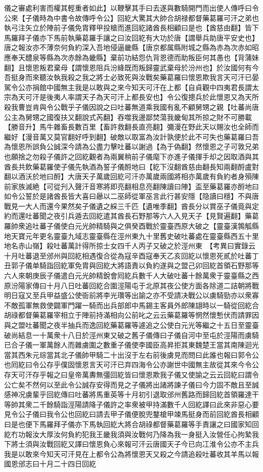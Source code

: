 儀之審處利害而權其輕重者如此】以鞭擊其手曰去遂與數騎開門而出使人傳呼曰令公來【子儀時為中書令故傳呼令公】回紇大驚其大帥合胡禄都督藥葛羅可汗之弟也執弓注矢立於陣前子儀免胄釋甲投槍而進回紇諸酋長相顧曰是也【酋慈由翻】皆下馬羅拜子儀亦下馬前執藥葛羅手讓之曰汝回紇有大功於唐【謂舉兵助唐平安史也】唐之報汝亦不薄奈何負約深入吾地侵逼畿縣【唐京都属縣附城之縣為赤為次赤如昭應奉天醴泉等縣為次赤餘為畿縣】棄前功結怨仇背恩德而助叛臣何其愚也【背蒲妹翻】且懷恩叛君棄母【謂懷恩阻兵汾絳既而叛歸靈武棄母於汾州也】於汝國何有今吾挺身而來聽汝執我殺之我之將士必致死與汝戰矣藥葛羅曰懷恩欺我言天可汗已晏駕令公亦捐館中國無主我是以敢與之來今知天可汗在上都【自貞觀中四夷君長謂太宗為天可汗是後夷人率謂天子為天可汗上都長安也】令公復摠兵於此懷恩又為天所殺我曹豈肯與令公戰乎子儀因說之曰吐蕃無道乘我國有亂不顧舅甥之親【吐蕃尚唐公主為舅甥之國復扶又翻說式芮翻】吞噬我邊鄙焚蕩我畿甸其所掠之財不可勝載【勝音升】馬牛雜畜長數百里【畜許救翻長直亮翻】彌漫在野此天以賜汝也全師而繼好【漫音萬又莫官翻好呼到翻】破敵以取富為汝計孰便於此不可失也藥葛羅曰吾為懷恩所誤負公誠深今請為公盡力擊吐蕃以謝過【為于偽翻】然懷恩之子可敦兄弟也願捨之勿殺子儀許之回紇觀者為兩翼稍前子儀麾下亦進子儀揮手却之因取酒與其酋長共飲藥葛羅使子儀先執酒為誓子儀酹地曰【紇下沒翻酋慈由翻長知兩翻酹盧對翻以酒沃於地曰酹】大唐天子萬歲回紇可汗亦萬歲兩國將相亦萬歲有負約者身殞陳前家族滅絶【可從刋入聲汗音寒將即亮翻相息亮翻陳讀曰陣】盃至藥葛羅亦酹地曰如令公誓於是諸酋長皆大喜曰曏以二巫師從軍巫言此行甚安隱【隐讀曰穩】不與唐戰見一大人而還今果然矣子儀遺之綵三千匹【遺唯季翻】酋長分以賞巫子儀竟與定約而還吐蕃聞之夜引兵遁去回紇遣其酋長石野那等六人入見天子【見賢遍翻】藥葛羅帥衆追吐蕃子儀使白元光帥精騎與之俱癸酉戰於靈臺西原大破之【靈臺漢鶉觚縣地天寶元年更名靈臺九域志靈臺縣在涇州東九十里舊史破吐蕃處在靈臺縣西五十里地名赤山嶺】殺吐蕃萬計得所掠士女四千人丙子又破之於涇州東　【考異曰實錄云十月吐蕃退至邠州與回紇相遇復合從為寇辛酉寇奉天乙亥回紇以懷恩死貳於吐蕃丁丑郭子儀单騎詣回紇軍免胄與回紇大將語責以負約遂與之盟己卯回紇首領石野那等六人來朝庚辰子儀遣白元光帥精銳會囘紇兵數千人大破吐蕃十餘萬衆于靈臺縣之西原汾陽家傳曰十月八日吐蕃回紇合圍涇陽屯于北原其夜公使方面各除道二詰朝將戰明日寇又至兵甲益盛公使衙前將李光瓚等出諭之亦不受請决戰公以虜騎勁亦以衆寡不敵孤軍無救使闢軍門躍一騎而出兵部郎中馬錫主客員外郎陳翃時以一騎從回紇合胡祿都督藥葛羅宰相立于陣前持滿相向公前叱之云云藥葛羅等惘然懷慙伏而請罪因與之盟吐蕃聞之夜半抽兵而逸回紇藥葛羅等遽追之公使白元光等繼之十五日至靈臺破尚結息一十萬衆十八日於涇州東又破之舊子儀傳曰子儀自河中至屯於涇陽而虜騎已合子儀一軍萬餘人而雜虜圍之數重子儀使李國臣高昇拒其東魏楚王當其南陳迴光當其西朱元琮當其北子儀帥甲騎二十出沒于左右前後虜見而問曰此誰也報曰郭令公也囘紇曰令公存乎僕固懷恩言天可汗已弃四海令公亦謝世中國無主故從其來今令公存天可汗存乎報之曰皇帝萬夀無彊回紇皆曰懷恩欺我子儀又使諭之云云回紇曰謂令公亡矣不然何以至此令公誠存安得而見之子儀將出諸將諫子儀曰今力固不敵且至誠感神况虜輩乎回紇傳曰吐蕃將馬重英等十月初引退取邠州舊路而歸回紇首領羅達干等帥其衆二千餘騎詣涇陽請降子儀許之率衆被甲持滿數千人回紇譯曰此來非惡心要見令公子儀曰我令公也回紇曰請去甲子儀便脫兜鍪槍甲竦馬挺身而前回紇酋長相顧曰是也便下馬羅拜子儀亦下馬執回紇大將合胡祿都督藥葛羅等手責讓之曰國家知回紇冇功報汝大厚汝何負約犯我王畿我須與汝戰何乃降為我一身挺入汝營任心拘縶我下將士須與汝戰回紇又譯曰懷恩負心來報可汗云唐國天子今已向冮淮令公亦不主兵我是以敢來今知天可汗見在上都令公為將懷恩天又殺之今請追殺吐蕃收其羊馬以報國恩邠志曰十月二十四日回紇